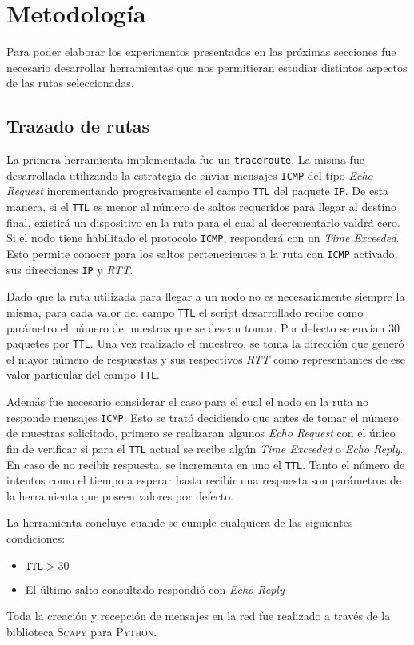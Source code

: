 \section{Metodología}

Para poder elaborar los experimentos presentados en las próximas secciones fue
necesario desarrollar herramientas que nos permitieran estudiar distintos
aspectos de las rutas seleccionadas.

\subsection{Trazado de rutas}

La primera herramienta implementada fue un \texttt{traceroute}. La misma fue
desarrollada utilizando la estrategia de enviar mensajes \texttt{ICMP} del tipo
\emph{Echo Request} incrementando progresivamente el campo \texttt{TTL}
del paquete \texttt{IP}. De esta manera, si el \texttt{TTL} es menor al número
de saltos requeridos para llegar al destino final, existirá un dispositivo en la
ruta para el cual al decrementarlo valdrá cero. Si el nodo tiene habilitado
el protocolo \texttt{ICMP}, responderá con un \emph{Time Exceeded}. Esto permite
conocer para los saltos pertenecientes a la ruta con \texttt{ICMP} activado, sus
direcciones \texttt{IP} y \emph{RTT}.

Dado que la ruta utilizada para llegar a un nodo no es necesariamente
siempre la misma, para cada valor del campo \texttt{TTL} el script desarrollado
recibe como parámetro el número de muestras que se desean tomar. Por defecto se
envían 30 paquetes por \texttt{TTL}. Una vez realizado el muestreo, se toma la
dirección que generó el mayor número de respuestas y sus respectivos \emph{RTT}
como representantes de ese valor particular del campo \texttt{TTL}.

Además fue necesario considerar el caso para el cual el nodo en la ruta no
responde mensajes \texttt{ICMP}. Esto se trató decidiendo que antes de tomar
el número de muestras solicitado, primero se realizaran algunos \emph{Echo
Request} con el único fin de verificar si para el \texttt{TTL} actual se recibe algún
\emph{Time Exceeded} o \emph{Echo Reply}. En caso de no recibir respuesta, se
incrementa en uno el \texttt{TTL}. Tanto el número de intentos como el tiempo a
esperar hasta recibir una respuesta son parámetros de la herramienta que poseen
valores por defecto.

La herramienta concluye cuande se cumple cualquiera de las siguientes
condiciones:

\begin{itemize}
    \item $\texttt{TTL} > 30$
    \item El último salto consultado respondió con \emph{Echo Reply}
\end{itemize}

Toda la creación y recepción de mensajes en la red fue realizado a través de la
biblioteca \textsc{Scapy} para \textsc{Python}.
